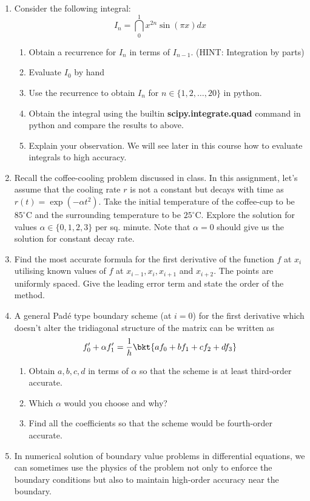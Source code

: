 \documentclass{article}
\begin{document}
	\begin{enumerate}
		\item
		Consider the following integral:
		$$I_n = \dint_0^1 x^{2n} \sin(\pi x) dx$$
		\begin{enumerate}
			\item
			Obtain a recurrence for $I_n$ in terms of $I_{n-1}$. (HINT: Integration by parts)
			\item
			Evaluate $I_0$ by hand
			\item
			Use the recurrence to obtain $I_n$ for $n \in \{1,2,\ldots,20\}$ in python.
			\item
			Obtain the integral using the builtin {\color{magenta}\textbf{scipy.integrate.quad}} command in python and compare the results to above.
			\item
			Explain your observation. We will see later in this course how to evaluate integrals to high accuracy.
		\end{enumerate}
		\item
		Recall the coffee-cooling problem discussed in class. In this assignment, let's assume that the cooling rate $r$ is not a constant but decays with time as $r(t) = \exp(-\alpha t^2)$. Take the initial temperature of the coffee-cup to be $85^{\circ}$C and the surrounding temperature to be $25^{\circ}$C. Explore the solution for values $\alpha \in \{0,1,2,3\}$ per sq. minute. Note that $\alpha = 0$ should give us the solution for constant decay rate.
		\item
		Find the most accurate formula for the first derivative of the function $f$ at $x_i$ utilising known values of $f$ at $x_{i-1},x_i,x_{i+1}$ and $x_{i+2}$. The points are uniformly spaced. Give the leading error term and state the order of the method.
		\item
		A general Pad\'e type boundary scheme (at $i=0$) for the first derivative which doesn't alter the tridiagonal structure of the matrix can be written as
		$$f_0'+\alpha f_1' = \dfrac1h \bkt{af_0+bf_1+cf_2+df_3}$$
		\begin{enumerate}
			\item
			Obtain $a,b,c,d$ in terms of $\alpha$ so that the scheme is at least third-order accurate.
			\item
			Which $\alpha$ would you choose and why?
			\item
			Find all the coefficients so that the scheme would be fourth-order accurate.
		\end{enumerate}
		\item
		In numerical solution of boundary value problems in differential equations, we can sometimes use the physics of the problem not only to enforce the boundary conditions but also to maintain high-order accuracy near the boundary.\\

\end{enumerate}
\end{document}
